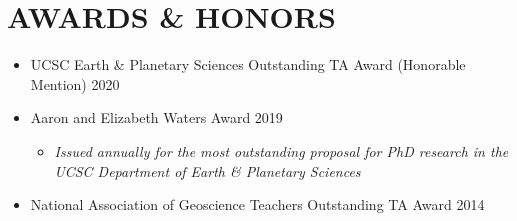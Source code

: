 \section*{AWARDS \& HONORS}

\begin{itemize} [leftmargin=0pt,label={},itemsep=1ex]
	\item UCSC Earth \& Planetary Sciences Outstanding TA Award (Honorable Mention) \hfill 2020
	\item Aaron and Elizabeth Waters Award  \hfill 2019
	\begin{itemize} [label={}, rightmargin=30ex]
	\item \textit{Issued annually for the most outstanding proposal for PhD research in the UCSC Department of Earth \& Planetary Sciences}
	\end{itemize}
	\item National Association of Geoscience Teachers Outstanding TA Award \hfill 2014
\end{itemize}